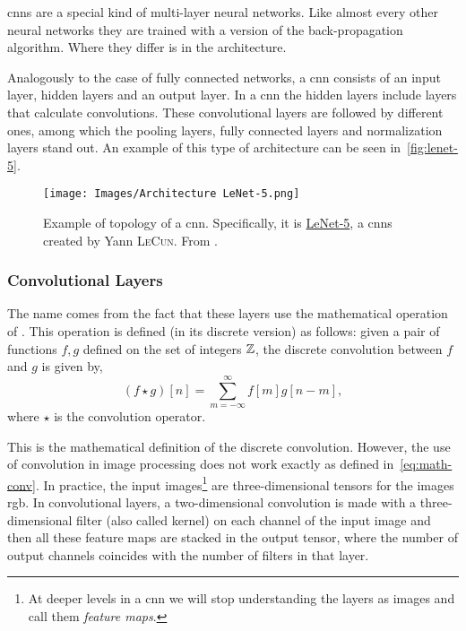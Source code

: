 \begin{quoteBox}
  \acsp{cnn} are a special kind of multi-layer neural networks. Like almost
  every other neural networks they are trained with a version of the
  back-propagation algorithm. Where they differ is in the architecture.
  \tcblower{}
\end{quoteBox}

Analogously to the case of fully connected networks, a \gls{cnn} consists of an
input layer, hidden layers and an output layer. In a \gls{cnn} the hidden
layers include layers that calculate convolutions. These convolutional layers
are followed by different ones, among which the pooling layers, fully connected
layers and normalization layers stand out. An example of this type of
architecture can be seen in\ \vref{fig:lenet-5}.

\begin{figure}[ht]
  \centering
  \texttt{[image: Images/Architecture LeNet-5.png]}
  \caption[Example of topology of a  (LeNet-5)]{Example of
    topology of a \gls{cnn}. Specifically, it is
    \href{http://yann.lecun.com/exdb/lenet}{LeNet-5}, a \acp{cnn} created by
    Yann \textsc{LeCun}. From .}%
  \label{fig:lenet-5}
\end{figure}

\subsubsection{Convolutional Layers}

The name comes from the fact that these layers use the mathematical operation
of . This
operation is defined (in its discrete version) as follows: given a pair of
functions \(f, g\) defined on the set of integers \(\mathbb{Z}\), the discrete
convolution between \(f\) and \(g\) is given by,
\begin{equation} \label{eq:math-conv}
  (f \star g)[n] = \sum_{m=-\infty}^{\infty} f[m]g[n - m],
\end{equation}
where \(\star\) is the convolution operator.

This is the mathematical definition of the discrete convolution. However, the
use of convolution in image processing does not work
exactly as defined in\ \vref{eq:math-conv}. In practice, the input
images\footnote{At deeper levels in a \gls{cnn} we will stop understanding the
  layers as images and call them \emph{feature maps}.} are three-dimensional
tensors for the images \acs{rgb}. In convolutional layers, a two-dimensional
convolution is made with a three-dimensional filter (also called kernel) on
each channel of the input image and then all these feature maps are stacked in
the output tensor, where the number of output channels coincides with the
number of filters in that layer.

